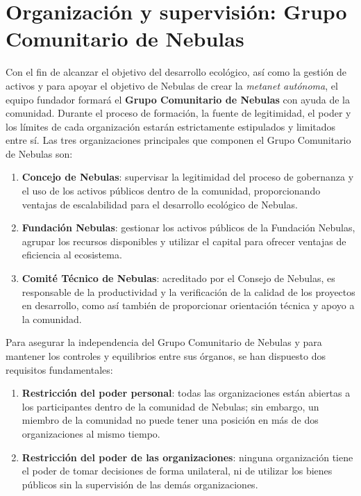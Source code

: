 \section{Organización y supervisión: Grupo Comunitario de Nebulas}

Con el fin de alcanzar el objetivo del desarrollo ecológico, así como la gestión de activos y para apoyar el objetivo de Nebulas de crear la \textit{metanet autónoma}, el equipo fundador formará el \textbf{Grupo Comunitario de Nebulas} con ayuda de la comunidad. Durante el proceso de formación, la fuente de legitimidad, el poder y los límites de cada organización estarán estrictamente estipulados y limitados entre sí. Las tres organizaciones principales que componen el Grupo Comunitario de Nebulas son:

\begin{enumerate}
	\item \textbf{Concejo de Nebulas}: supervisar la legitimidad del proceso de gobernanza y el uso de los activos públicos dentro de la comunidad, proporcionando ventajas de escalabilidad para el desarrollo ecológico de Nebulas.

	\item \textbf{Fundación Nebulas}: gestionar los activos públicos de la Fundación Nebulas, agrupar los recursos disponibles y utilizar el capital para ofrecer ventajas de eficiencia al ecosistema.

	\item \textbf{Comité Técnico de Nebulas}: acreditado por el Consejo de Nebulas, es responsable de la productividad y la verificación de la calidad de los proyectos en desarrollo, como así también de proporcionar orientación técnica y apoyo a la comunidad.

\end{enumerate}

\vspace{2em}

Para asegurar la independencia del Grupo Comunitario de Nebulas y para mantener los controles y equilibrios entre sus órganos, se han dispuesto dos requisitos fundamentales:

\begin{enumerate}
	\item \textbf{Restricción del poder personal}: todas las organizaciones están abiertas a los participantes dentro de la comunidad de Nebulas; sin embargo, un miembro de la comunidad no puede tener una posición en más de dos organizaciones al mismo tiempo.
	\item \textbf{Restricción del poder de las organizaciones}: ninguna organización tiene el poder de tomar decisiones de forma unilateral, ni de utilizar los bienes públicos sin la supervisión de las demás organizaciones.
\end{enumerate}

